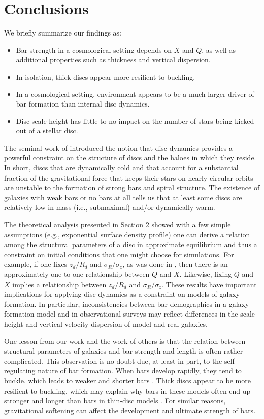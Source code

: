 \section{Conclusions}\label{sec:conclusions}
{
We briefly summarize our findings as:
\begin{itemize}
\item Bar strength in a cosmological setting depends on $X$ and $Q$, as well as additional properties such as thickness and vertical dispersion.
\item In isolation, thick discs appear more resilient to buckling.
\item In a cosmological setting, environment appears to be a much larger driver of bar formation than internal disc dynamics.
\item Disc scale height has little-to-no impact on the number of stars being kicked out of a stellar disc.
\end{itemize}
}

The seminal work of \citet{PeeblesOstriker1973} introduced the notion
that disc dynamics provides a powerful constraint on the structure of
discs and the haloes in which they reside.  In short, discs that are
dynamically cold and that account for a substantial fraction of the
gravitational force that keeps their stars on nearly circular orbits
are unstable to the formation of strong bars and spiral structure.
The existence of galaxies with weak bars or no bars at all tells us
that at least some discs are relatively low in mass (i.e., submaximal)
and/or dynamically warm.

The theoretical analysis presented in Section 2 showed with a few
simple assumptions (e.g., exponential surface density profile) one can
derive a relation among the structural parameters of a disc in
approximate equilibrium and thus a constraint on initial conditions
that one might choose for simulations.  For example, if one fixes
$z_d/R_d$ and $\sigma_R/\sigma_z$, as was done in
\citet{YurinSpringelStellarDisks}, then there is an approximately
one-to-one relationship between $Q$ and $X$.  Likewise, fixing $Q$ and
$X$ implies a relationship between $z_d/R_d$ and $\sigma_R/\sigma_z$.
These results have important implications for applying disc dynamics
as a constraint on models of galaxy formation.  In particular,
inconsistencies between bar demographics in a galaxy formation model
and in observational surveys may reflect differences in the scale
height and vertical velocity dispersion of model and real galaxies.

One lesson from our work and the work of others is that the relation
between structural parameters of galaxies and bar strength and length
is often rather complicated.  This observation is no doubt due, at
least in part, to the self-regulating nature of bar formation.  When
bars develop rapidly, they tend to buckle, which leads to weaker and
shorter bars \citep{VP2004}.  Thick discs appear to be more resilient
to buckling, which may explain why bars in these models often end up
stronger and longer than bars in thin-disc models \citep{Klypin2009}.
For similar reasons, gravitational softening can affect the
development and ultimate strength of bars.

